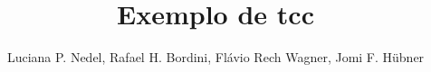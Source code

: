 \title{Exemplo de tcc}

\author{Luciana P. Nedel, Rafael H. Bordini, Flávio Rech
	Wagner, Jomi F. Hübner }


\address{Instituto de Informática -- Universidade Federal do Rio Grande do Sul
	(UFRGS)\\
	Caixa Postal 15.064 -- 91.501-970 -- Porto Alegre -- RS -- Brazil
	\nextinstitute
	Department of Computer Science -- University of Durham\\
	Durham, U.K.
	\nextinstitute
	Departamento de Sistemas e Computação\\
	Universidade Regional de Blumenal (FURB) -- Blumenau, SC -- Brazil
}
